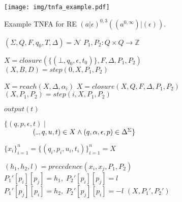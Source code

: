 \documentclass[AMA,STIX1COL]{WileyNJD-v2}
\newcommand{\Xund}{\rule{.4em}{.4pt}}
\newcommand{\XN}{\mathcal{N}}
\newcommand{\YZ}{\mathbb{Z}}
\begin{document}
\begin{figure}\label{fig_tnfa_example}
\texttt{[image: img/tnfa\_example.pdf]}
\vspace{-2em}
\caption{
    Example TNFA for RE $(a|\epsilon)^{0,3}((a^{0,\infty})|(\epsilon))$.
}
\end{figure}


\FloatBarrier


\begin{figure*}
\begin{multicols}{2}
    \newcommand \ff {f\!\!f}

    \begin{algorithm}[H] \DontPrintSemicolon {} 
    \Fn {$\underline{match (\XN, \alpha_1 \dots \alpha_n)} \smallskip$} {
        $(\Sigma, Q, F, q_0, T, \Delta) = \XN$ \;
        $P_1, P_2: Q \times Q \rightarrow \YZ$ \;
        \BlankLine

        $X = closure(\{ (\bot, q_0, \epsilon, t_0) \}, F, \Delta, P_1, P_2)$ \;
        $(X, B, D) = step(0, X, P_1, P_2)$ \;

        \BlankLine
         {
            $X = reach(X, \Delta, \alpha_i)$ \;
            $X = closure(X, Q, F, \Delta, P_1, P_2)$ \;
            $(X, P_1, P_2) = step(i, X, P_1, P_2)$ \;
        }

        \BlankLine
        \If {$\exists (\Xund, p, \Xund, t) \in X \mid p \in F$} {
            \Return $output(t)$
        } \lElse {
            \Return $\bot$
        }
    }
    \end{algorithm}


    \begin{algorithm}[H] \DontPrintSemicolon {} 
     {
        \Return $\{ (q, p, \epsilon, t) \mid $ \\
            $\hspace{4em} (\Xund, q, u, t) \in X \wedge (q, \alpha, \epsilon, p) \in \Delta^\Sigma \}$
    }
    \end{algorithm}


    \begin{algorithm}[H] \DontPrintSemicolon {} 
     {
        $\{ x_i \}_{i=1}^{n} = \{(q_i, p_i, u_i, t_i) \}_{i=1}^{n} = X$ \;

         {
             {
                $(h_1, h_2, l) = precedence (x_i, x_j, P_1, P_2)$ \;
                $P_1' [p_i] [p_j] = h_1, \; P_2' [p_i] [p_j] = l$ \;
                $P_1' [p_j] [p_i] = h_2, \; P_2' [p_j] [p_i] = -l$
            }
        }
        \BlankLine
        \Return $(X, P_1', P_2')$ \;
    }
    \end{algorithm}


\end{multicols}
\end{figure*}
\end{document}
